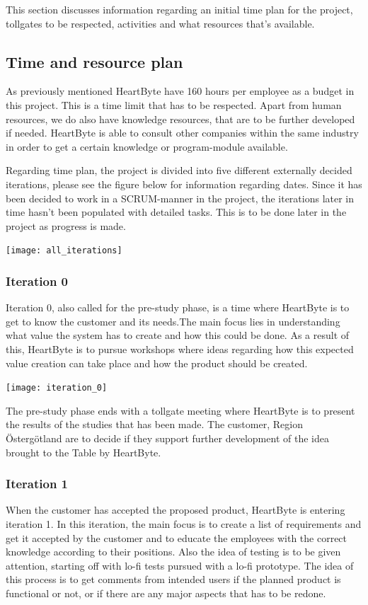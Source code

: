 This section discusses information regarding an initial time plan for the project, tollgates to be respected, activities and what resources that's available.

\subsection{Time and resource plan}
As previously mentioned HeartByte have 160 hours per employee as a budget in this project. This is a time limit that has to be respected. Apart from human resources, we do also have knowledge resources, that are to be further developed if needed. HeartByte is able to consult other companies within the same industry in order to get a certain knowledge or program-module available.\vspace{5mm}

Regarding time plan, the project is divided into five different externally decided iterations, please see the figure below for information regarding dates. Since it has been decided to work in a SCRUM-manner in the project, the iterations later in time hasn't been populated with detailed tasks. This is to be done later in the project as progress is made. 
\begin{center}
    \texttt{[image: all\_iterations]}
\end{center}
   
\subsubsection{Iteration 0}
Iteration 0, also called for the pre-study phase, is a time where HeartByte is to get to know the customer and its needs.The main focus lies in understanding what value the system has to create and how this could be done. As a result of this, HeartByte is to pursue workshops where ideas regarding how this expected value creation can take place and how the product should be created.
\begin{center}
    \texttt{[image: iteration\_0]}
\end{center}

The pre-study phase ends with a tollgate meeting where HeartByte is to present the results of the studies that has been made. The customer, Region Östergötland are to decide if they support further development of the idea brought to the Table by HeartByte.

\subsubsection{Iteration 1}
When the customer has accepted the proposed product, HeartByte is entering iteration 1. In this iteration, the main focus is to create a list of requirements and get it accepted by the customer and to educate the employees with the correct knowledge according to their positions. Also the idea of testing is to be given attention, starting off with lo-fi tests pursued with a lo-fi prototype. The idea of this process is to get comments from intended users if the planned product is functional or not, or if there are any major aspects that has to be redone.

